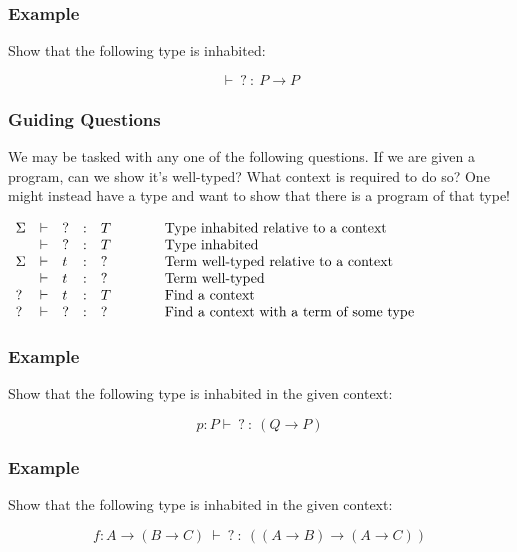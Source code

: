 \documentclass{beamer}
\theoremstyle{indentDefn} \newtheorem{defn}[]{Definition}
\begin{document}
\begin{frame}
  \frametitle{Example}

  Show that the following type is inhabited: 

  $$ \vdash \ ? \ : \ P \to P$$

  \vspace{7cm}
\end{frame}


\begin{frame}
  \frametitle{Guiding Questions}

  We may be tasked with any one of the following questions. If we are given a program, can we show it's well-typed? What context is required to do so? One might instead have a type and want to show that there is a program of that type!

  \begin{center}
    $\begin{array}{l l l l l l}
      \Sigma & \vdash & ? & : & T & \hspace{1cm} \text{Type inhabited relative to a context} \\
      \ & \vdash & ? & : & T & \hspace{1cm} \text{Type inhabited} \\
      \Sigma & \vdash & t & : & ? & \hspace{1cm} \text{Term well-typed relative to a context} \\
      \ & \vdash & t & : & ? & \hspace{1cm} \text{Term well-typed} \\
      ? & \vdash & t & : & T & \hspace{1cm} \text{Find a context} \\
      ? & \vdash & ? & : & ? & \hspace{1cm} \text{Find a context with a term of some type}
    \end{array}$
\end{center}
\end{frame}

\begin{frame}
  \frametitle{Example}

  Show that the following type is inhabited in the given context:

  $$ p : P \vdash \ ? \ : \ (Q \to P)$$

  \vspace{7cm}
\end{frame}

\begin{frame}
  \frametitle{Example}

  Show that the following type is inhabited in the given context:

  $$ f : A \to (B \to C) \ \vdash \ ? \ : \ ((A \to B) \to (A \to C))$$

  \vspace{7cm}
\end{frame}
\end{document}
